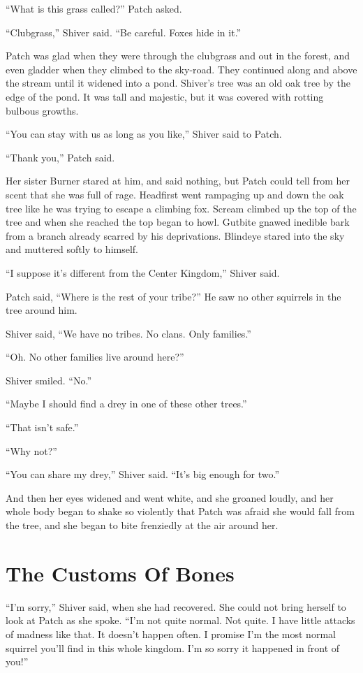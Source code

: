 \documentclass[ebook,oneside,openany,12pt]{memoir}
\begin{document}
“What is this grass called?” Patch asked.

“Clubgrass,” Shiver said. “Be careful. Foxes hide in it.”

Patch was glad when they were through the clubgrass and out in the
forest, and even gladder when they climbed to the sky-road. They
continued along and above the stream until it widened into a
pond. Shiver’s tree was an old oak tree by the edge of the pond. It
was tall and majestic, but it was covered with rotting bulbous
growths.

“You can stay with us as long as you like,” Shiver said to Patch.

“Thank you,” Patch said.

Her sister Burner stared at him, and said nothing, but Patch could
tell from her scent that she was full of rage. Headfirst went
rampaging up and down the oak tree like he was trying to escape a
climbing fox. Scream climbed up the top of the tree and when she
reached the top began to howl. Gutbite gnawed inedible bark from a
branch already scarred by his deprivations. Blindeye stared into the
sky and muttered softly to himself.

“I suppose it’s different from the Center Kingdom,” Shiver said.

Patch said, “Where is the rest of your tribe?” He saw no other
squirrels in the tree around him.

Shiver said, “We have no tribes. No clans. Only families.”

“Oh. No other families live around here?”

Shiver smiled. “No.”

“Maybe I should find a drey in one of these other trees.”

“That isn’t safe.”

“Why not?”

“You can share my drey,” Shiver said. “It’s big enough for two.”

And then her eyes widened and went white, and she groaned loudly, and
her whole body began to shake so violently that Patch was afraid she
would fall from the tree, and she began to bite frenziedly at the air
around her.


\section{The Customs Of Bones}

“I’m sorry,” Shiver said, when she had recovered. She could not bring
herself to look at Patch as she spoke. “I’m not quite normal. Not
quite. I have little attacks of madness like that. It doesn’t happen
often. I promise I’m the most normal squirrel you’ll find in this
whole kingdom. I’m so sorry it happened in front of you!”
\end{document}
